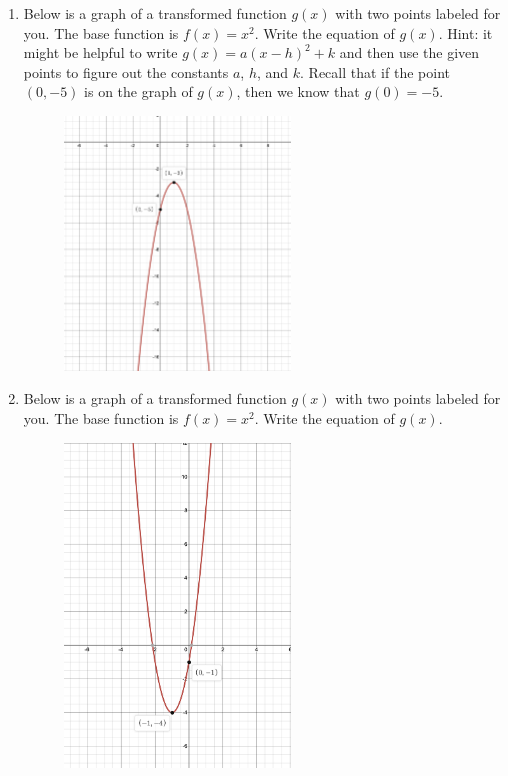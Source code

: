 \documentclass[12pt]{amsart}
\begin{document}
\begin{enumerate}
\pagebreak

\item Below is a graph of a transformed function $g(x)$ with two points labeled for you.  The base function is $f(x)=x^2$.  Write the equation of $g(x)$.  Hint: it might be helpful to write $g(x)=a(x-h)^2+k$ and then use the given points to figure out the constants $a$, $h$, and $k$.  Recall that if the point $(0,-5)$ is on the graph of $g(x)$, then we know that $g(0)=-5$.
\begin{figure}[!h]
\includegraphics[width=6cm]{parabola1.png}
\end{figure}


\item Below is a graph of a transformed function $g(x)$ with two points labeled for you.  The base function is $f(x)=x^2$.  Write the equation of $g(x)$.  
\begin{figure}[!h]
\includegraphics[width=6cm]{parabola2.png}
\end{figure}

\pagebreak


\end{enumerate}
\end{document}
